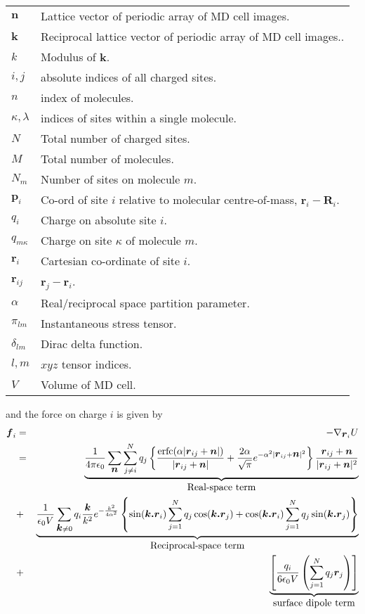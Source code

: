 \begin{tabular}{ll}
$\bm{n}$	& Lattice vector of periodic array of MD cell images. \\
$\bm{k}$	& Reciprocal lattice vector of periodic array of MD cell images.. \\
$k$		& Modulus of $\bm{k}$. \\
$i,j$		& absolute indices of all charged sites. \\
$n$		& index of molecules. \\
$\kappa,\lambda$ & indices of sites within a single molecule. \\
$N$		& Total number of charged sites. \\
$M$		& Total number of molecules. \\
$N_m$		& Number of sites on molecule $m$. \\
$\bm{p}_i$	& Co-ord of site $i$ relative to molecular 
centre-of-mass, $\bm{r}_i - \bm{R}_i$. \\
$q_i$		& Charge on absolute site $i$. \\
$q_{m\kappa}$	& Charge on site $\kappa$ of molecule $m$. \\
$\bm{r}_i$	& Cartesian co-ordinate of site $i$. \\
$\bm{r}_{ij}$	& $\bm{r}_j - \bm{r}_i$. \\
$\alpha$	& Real/reciprocal space partition parameter. \\
$\pi_{lm}$	& Instantaneous stress tensor. \\
$\delta_{lm}$	& Dirac delta function. \\
$l, m$		& $xyz$ tensor indices. \\
$V$		& Volume of MD cell.
\end{tabular}

and the force on charge $i$ is given by
\begin{eqnarray}
\label{eqn:ewald-force}
\mbox{\boldmath \protect\(f\protect\)}_i &=& - \nabla_{\mbox{\boldmath \protect\(r\protect\)}_i} U \nonumber \\
& = &  \underbrace{\frac{1}{4 \pi \epsilon_0}
\sum_{\mbox{\boldmath \protect\(n\protect\)}} \sum_{j \neq i}^{N} q_j \left \lbrace 
\frac{\mbox{erfc}( \alpha | \mbox{\boldmath \protect\(r\protect\)}_{ij} +  \mbox{\boldmath \protect\(n\protect\)} |)}{ | \mbox{\boldmath \protect\(r\protect\)}_{ij} +\mbox{\boldmath \protect\(n\protect\)} | } +
\frac{2 \alpha}{\sqrt{\pi}}e^{- \alpha^2 | \mbox{\boldmath \protect\(r\protect\)}_{ij} +  \mbox{\boldmath \protect\(n\protect\)} |^2}
\right \rbrace \frac{ \mbox{\boldmath \protect\(r\protect\)}_{ij} + \mbox{\boldmath \protect\(n\protect\)}}{ | \mbox{\boldmath \protect\(r\protect\)}_{ij} + \mbox{\boldmath \protect\(n\protect\)} |^2}
}_{\mbox{Real-space term}} \nonumber \\
 & + & \underbrace{\frac{1}{\epsilon_0 V} 
\sum_{\mbox{\boldmath \protect\(k\protect\)} \ne 0} q_i \frac{\mbox{\boldmath \protect\(k\protect\)}}{k^2} e^{-\frac{k^2}{4 \alpha^2}} 
\left \lbrace 
\sin(\mbox{\boldmath \protect\(k.r\protect\)}_i) \sum_{j=1}^{N} q_j \cos(\mbox{\boldmath \protect\(k.r\protect\)}_j)  + 
\cos(\mbox{\boldmath \protect\(k.r\protect\)}_i) \sum_{j=1}^{N} q_j \sin(\mbox{\boldmath \protect\(k.r\protect\)}_j) 
\right \rbrace}_{\mbox{Reciprocal-space term}}\\ 
& + & \underbrace{\left [  \frac{q_i}{6 \epsilon_0 V} 
                    \left ( \sum_{j=1}^N q_j \mbox{\boldmath \protect\(r\protect\)}_j
                    \right ) \right ]}_{\mbox{surface dipole term}}
\nonumber
\end{eqnarray}

